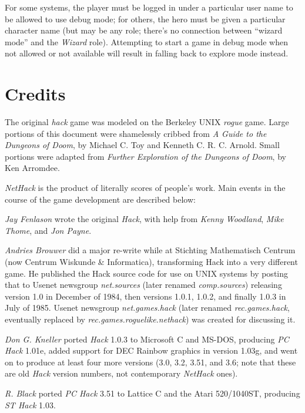 \documentclass[titlepage]{article}
\begin{document}
For some systems, the player must be logged in
under a particular user name to be allowed to use debug mode; for others,
the hero must be given a particular character name (but may be any role;
there's no connection between ``wizard mode'' and the \textit{Wizard} role).
Attempting to start a game in debug mode when not allowed
or not available will result in falling back to explore mode instead.

\section{Credits}
The original %
\textit{hack} game was modeled on the Berkeley
UNIX
\textit{rogue} game.  Large portions of this document were shamelessly
cribbed from %
\textit{A Guide to the Dungeons of Doom}, by Michael C. Toy
and Kenneth C. R. C. Arnold.  Small portions were adapted from
\textit{Further Exploration of the Dungeons of Doom}, by Ken Arromdee.

\textit{NetHack} is the product of literally scores of people's work.
Main events in the course of the game development are described below:

\bigskip
\noindent \textit{Jay Fenlason} wrote the original \textit{Hack}, with help from {\it
Kenny Woodland}, \textit{Mike Thome}, and \textit{Jon Payne}.

\medskip
\noindent \textit{Andries Brouwer} did a major re-write while at
Stichting Mathematisch Centrum (now Centrum Wiskunde \& Informatica),
transforming Hack into a very different game.
He published the Hack source code for use on UNIX
systems by posting that to Usenet
newsgroup \textit{net.sources} (later renamed \textit{comp.sources})
releasing version 1.0 in December of 1984, then versions 1.0.1, 1.0.2,
and finally 1.0.3 in July of 1985.
Usenet newsgroup \textit{net.games.hack} (later
renamed \textit{rec.games.hack}, eventually replaced
by \textit{rec.games.roguelike.nethack})
was created for discussing it.

\medskip
\noindent \textit{Don G. Kneller} ported \textit{Hack} 1.0.3 to Microsoft C and MS-DOS,
producing \textit{PC Hack} 1.01e, added support for DEC Rainbow graphics in
version 1.03g, and went on to produce at least four more versions (3.0, 3.2,
3.51, and 3.6;
note that these are old \textit{Hack} version numbers, not contemporary
\textit{NetHack} ones).

\medskip
\noindent \textit{R. Black} ported \textit{PC Hack} 3.51 to Lattice C and the Atari
520/1040ST, producing \textit{ST Hack} 1.03.
\end{document}
